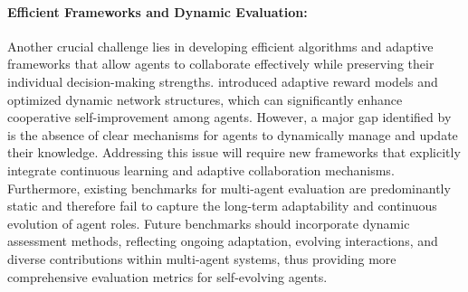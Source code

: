 \paragraph{Efficient Frameworks and Dynamic Evaluation:}
Another crucial challenge lies in developing efficient algorithms and adaptive frameworks that allow agents to collaborate effectively while preserving their individual decision-making strengths. \citep{hu2024self} introduced adaptive reward models and optimized dynamic network structures, which can significantly enhance cooperative self-improvement among agents. However, a major gap identified by \citep{sun2025collab} is the absence of clear mechanisms for agents to dynamically manage and update their knowledge. Addressing this issue will require new frameworks that explicitly integrate continuous learning and adaptive collaboration mechanisms. Furthermore, existing benchmarks for multi-agent evaluation are predominantly static \citep{zhu2025multiagentbench} and therefore fail to capture the long-term adaptability and continuous evolution of agent roles. Future benchmarks should incorporate dynamic assessment methods, reflecting ongoing adaptation, evolving interactions, and diverse contributions within multi-agent systems, thus providing more comprehensive evaluation metrics for self-evolving agents.

